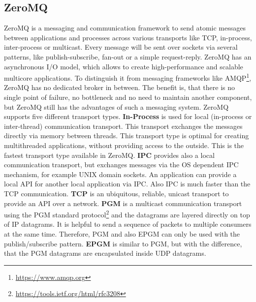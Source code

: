 \subsection{ZeroMQ}
\label{section:ZeroMQ}
ZeroMQ is a messaging and communication framework to send atomic messages between applications and processes across various transports like \ac{TCP}, in-process, inter-process or multicast.\autocite[cf.]{ZeroMQ:Guide}
Every message will be sent over sockets via several patterns, like publish-subscribe, fan-out or a simple request-reply.\autocite[cf.]{ZeroMQ:Guide}
ZeroMQ has an asynchronous I/O model, which allows to create high-performance and scalable multicore applications.\autocite[cf.]{ZeroMQ:Guide}
To distinguish it from messaging frameworks like \ac{AMQP}\footnote{\url{https://www.amqp.org}}, ZeroMQ has no dedicated broker in between.
The benefit is, that there is no single point of failure, no bottleneck and no need to maintain another component, but ZeroMQ still has the advantages of such a messaging system.
ZeroMQ supports five different transport types.\newline\newline
\textbf{In-Process} is used for local (in-process or inter-thread) communication transport.
This transport exchanges the messages directly via memory between threads.\autocite[cf.]{ZeroMQ:inproc}
This transport type is optimal for creating multithreaded applications, without providing access to the outside.
This is the fastest transport type available in ZeroMQ.\newline\newline
\textbf{\ac{IPC}} provides also a local communication transport, but exchanges messages via the \ac{OS} dependent \ac{IPC} mechanism, for example UNIX domain sockets.
An application can provide a local \ac{API} for another local application via \ac{IPC}.
Also \ac{IPC} is much faster than the \ac{TCP} communication.\newline\newline
\textbf{\ac{TCP}} is an ubiquitous, reliable, unicast transport to provide an \ac{API} over a network.\autocite[cf.]{ZeroMQ:tcp}\newline\newline
\textbf{\ac{PGM}} is a multicast communication transport using the \ac{PGM} standard protocol\footnote{\url{https://tools.ietf.org/html/rfc3208}} and the datagrams are layered directly on top of IP datagrams.\autocite[cf.]{ZeroMQ:pgm}
It is helpful to send a sequence of packets to multiple consumers at the same time.
Therefore, \ac{PGM} and also \acs{EPGM} can only be used with the publish/subscribe pattern.\newline\newline
\textbf{\ac{EPGM}} is similar to \ac{PGM}, but with the difference, that the PGM datagrams are encapsulated inside \ac{UDP} datagrams.\autocite[cf.]{ZeroMQ:pgm}


